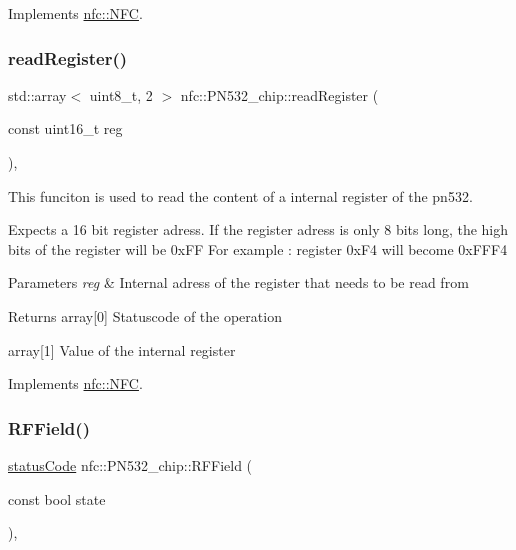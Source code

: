 Implements \hyperlink{classnfc_1_1NFC_a2d2ccf98ac7faaa8652a69c0242e031c}{nfc\+::\+N\+FC}.

\mbox{\label{classnfc_1_1PN532__chip_a7c3e596337bced5394689396d201bc13}} 
\subsubsection{\texorpdfstring{read\+Register()}{readRegister()}}
{\footnotesize\ttfamily std\+::array$<$ uint8\+\_\+t, 2 $>$ nfc\+::\+P\+N532\+\_\+chip\+::read\+Register (\begin{DoxyParamCaption}\item[{const uint16\+\_\+t}]{reg }\end{DoxyParamCaption})\hspace{0.3cm}{\ttfamily [override]}, {\ttfamily [virtual]}}



This funciton is used to read the content of a internal register of the pn532. 

Expects a 16 bit register adress. If the register adress is only 8 bits long, the high bits of the register will be 0x\+FF For example \+: register 0x\+F4 will become 0x\+F\+F\+F4 
\begin{DoxyParams}{Parameters}
{\em reg} & Internal adress of the register that needs to be read from \\
\hline
\end{DoxyParams}
\begin{DoxyReturn}{Returns}
array\mbox{[}0\mbox{]} Statuscode of the operation 

array\mbox{[}1\mbox{]} Value of the internal register 
\end{DoxyReturn}


Implements \hyperlink{classnfc_1_1NFC_a47da8428b5ee9011cc3f5e9cc501ce22}{nfc\+::\+N\+FC}.

\mbox{\label{classnfc_1_1PN532__chip_a23d21f68ecf6ea7c8a134436b94943b9}} 
\subsubsection{\texorpdfstring{R\+F\+Field()}{RFField()}}
{\footnotesize\ttfamily \hyperlink{declarations_8h_ae1d20c5a38cae82ccaa6a77be3fd264b}{status\+Code} nfc\+::\+P\+N532\+\_\+chip\+::\+R\+F\+Field (\begin{DoxyParamCaption}\item[{const bool}]{state }\end{DoxyParamCaption})\hspace{0.3cm}{\ttfamily [override]}, {\ttfamily [virtual]}}



